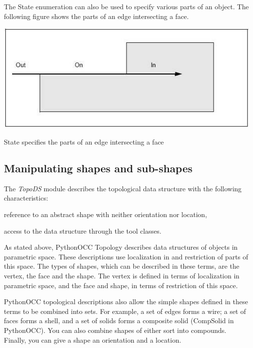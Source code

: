 The State enumeration can also be used to specify various parts of an object. The following figure shows the parts of an edge intersecting a face.


\begin{DoxyImage}
\begin{center}
 \includegraphics[width=\textwidth,height=\textheight/2,keepaspectratio=true]{modeling_data_image010.png}
\end{center}
\caption{State specifies the parts of an edge intersecting a face}
\end{DoxyImage}
\hypertarget{occt_user_guides__modeling_data_occt_modat_5_3}{}\subsection{Manipulating shapes and sub-\/shapes}\label{occt_user_guides__modeling_data_occt_modat_5_3}
The {\itshape Topo\+DS} module describes the topological data structure with the following characteristics\+:
\begin{DoxyItemize}
\item reference to an abstract shape with neither orientation nor location,
\item access to the data structure through the tool classes.
\end{DoxyItemize}

As stated above, Python\+O\+CC Topology describes data structures of objects in parametric space. These descriptions use localization in and restriction of parts of this space. The types of shapes, which can be described in these terms, are the vertex, the face and the shape. The vertex is defined in terms of localization in parametric space, and the face and shape, in terms of restriction of this space.

Python\+O\+CC topological descriptions also allow the simple shapes defined in these terms to be combined into sets. For example, a set of edges forms a wire; a set of faces forms a shell, and a set of solids forms a composite solid (Comp\+Solid in Python\+O\+CC). You can also combine shapes of either sort into compounds. Finally, you can give a shape an orientation and a location.

